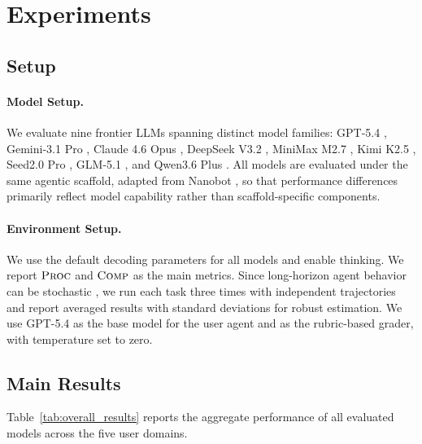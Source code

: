 
\section{Experiments}
\label{sec:exp}

\subsection{Setup}
\label{sec:exp_setup}

\paragraph{Model Setup.}
We evaluate nine frontier LLMs spanning distinct model families: GPT-5.4 \citep{gpt54}, Gemini-3.1 Pro \citep{gemini31pro}, Claude 4.6 Opus \citep{claudeopus46}, DeepSeek V3.2 \citep{liu2025deepseek}, MiniMax M2.7 \citep{minimax2026m27}, Kimi K2.5 \citep{team2026kimi}, Seed2.0 Pro \citep{seed20pro}, GLM-5.1 \citep{zai2026glm51}, and Qwen3.6 Plus \citep{qwen36plus}. 
All models are evaluated under the same agentic scaffold, adapted from Nanobot \citep{nanobot}, so that performance differences primarily reflect model capability rather than scaffold-specific components.

\paragraph{Environment Setup.}
We use the default decoding parameters for all models and enable thinking. We report $\textsc{Proc}$ and $\textsc{Comp}$ as the main metrics. Since long-horizon agent behavior can be stochastic \citep{mustahsan2025stochasticity}, we run each task three times with independent trajectories and report averaged results with standard deviations for robust estimation. We use GPT-5.4 as the base model for the user agent and as the rubric-based grader, with temperature set to zero.

\subsection{Main Results}
\label{sec:exp_main}



Table~\ref{tab:overall_results} reports the aggregate performance of all evaluated models across the five user domains.

